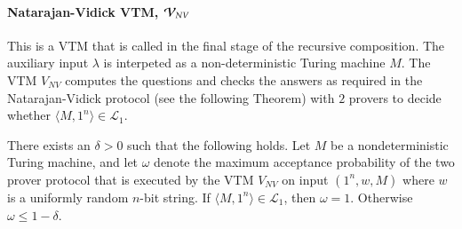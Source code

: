 \paragraph{Natarajan-Vidick VTM, $\mathcal V_{NV}$} This is a VTM that is called in the final stage of the recursive composition. The auxiliary input $\lambda$ is interpeted as a non-deterministic Turing machine $M$. The VTM $V_{NV}$ computes the questions and checks the answers as required in the Natarajan-Vidick protocol (see the following Theorem) with $2$ provers to decide whether $\langle M, 1^n \rangle \in \mathcal{L}_1$.

\begin{theorem}\label{thm:nv}
There exists an $\delta > 0$ such that the following holds. Let $M$ be a nondeterministic Turing machine, and let $\omega$ denote the maximum acceptance probability of the two prover protocol that is executed by the VTM $V_{NV}$ on input $(1^n,w,M)$ where $w$ is a uniformly random $n$-bit string. If $\langle M, 1^n \rangle \in \mathcal{L}_1$, then $\omega = 1$. Otherwise $\omega \leq 1 - \delta$. 
\end{theorem}


%




